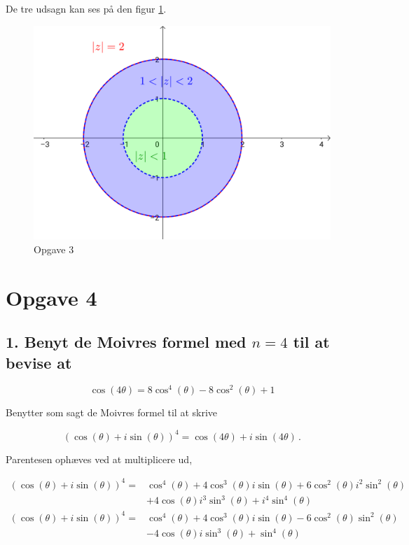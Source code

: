 \documentclass[a4paper, 12pt]{article}
\begin{document}
De tre udsagn kan ses på den figur \ref{opg3}.

\begin{figure}[htbp]
\centering
\includegraphics[width=.9\linewidth]{./img/opgave_3.png}
\caption{\label{opg3}Opgave 3}
\end{figure}

\section*{Opgave 4}
\label{sec:org95f5f49}

\subsection*{1. Benyt de Moivres formel med \(n=4\) til at bevise at}
\label{sec:orgf46108e}

$$\cos(4 \theta) = 8\cos^4(\theta) - 8 \cos^2(\theta) +1$$

Benytter som sagt de Moivres formel til at skrive

$$\left(\cos(\theta) + i \sin(\theta)\right)^4 = \cos(4\theta) + i \sin(4 \theta)\,.$$

Parentesen ophæves ved at multiplicere ud,

\begin{align*}
    \left(\cos(\theta) + i \sin(\theta)\right)^4 = &\cos^4(\theta) + 4 \cos^3(\theta) i \sin(\theta) + 6 \cos^2(\theta) i^2 \sin^2(\theta) \\
    &+ 4 \cos(\theta) i^3 \sin^3(\theta) +i^4 \sin^4(\theta) \\
    \left(\cos(\theta) + i \sin(\theta)\right)^4 = &\cos^4(\theta) + 4 \cos^3(\theta) i \sin(\theta) - 6 \cos^2(\theta) \sin^2(\theta) \\
    &- 4 \cos(\theta) i \sin^3(\theta) + \sin^4(\theta) 
\end{align*}
\end{document}

